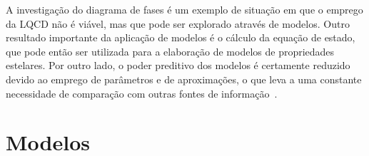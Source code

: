 A investigação do diagrama de fases é um exemplo de situação em que o emprego da LQCD não é viável, mas que pode ser explorado através de modelos. Outro resultado importante da aplicação de modelos é o cálculo da equação de estado, que pode então ser utilizada para a elaboração de modelos de propriedades estelares. Por outro lado, o poder preditivo dos modelos é certamente reduzido devido ao emprego de parâmetros e de aproximações, o que leva a uma constante necessidade de comparação com outras fontes de informação~\cite{Buballa}.


\section{Modelos}




